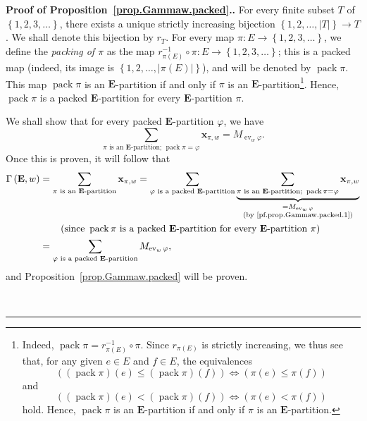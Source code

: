 \documentclass[numbers=enddot,12pt,final,onecolumn,notitlepage,abstracton]{scrartcl}
\theoremstyle{definition}
\newenvironment{proof}[1][Proof]{\noindent\textbf{#1.} }{\ \rule{0.5em}{0.5em}}
\let\sumnonlimits\sum
\renewcommand{\sum}{\sumnonlimits\limits}
\newcommand{\xx}{{\mathbf{x}}}
\newcommand{\ev}{\operatorname{ev}}
\newcommand{\pack}{\operatorname{pack}}
\newcommand{\EE}{{\mathbf{E}}}
\begin{document}
\begin{proof}[Proof of Proposition~\ref{prop.Gammaw.packed}.]
For every finite subset $T$ of
$\left\{1, 2, 3, \ldots\right\}$, there exists a unique strictly
increasing bijection $\left\{1, 2, \ldots,
\left|T\right|\right\} \to T$. We shall denote this bijection by
$r_T$.
For every map $\pi : E \to \left\{1, 2, 3, \ldots\right\}$, we
define the \textit{packing of $\pi$} as the map
$r_{\pi\left(E\right)}^{-1} \circ \pi : E \to
\left\{1, 2, 3, \ldots\right\}$; this is a packed map (indeed,
its image is
$\left\{1, 2, \ldots, \left|\pi\left(E\right)\right|\right\}$),
and will be
denoted by $\pack \pi$. This map $\pack \pi$ is an $\EE$-partition
if and only if $\pi$ is an $\EE$-partition\footnote{Indeed,
$\pack \pi = r_{\pi\left(E\right)}^{-1} \circ \pi$. Since
$r_{\pi\left(E\right)}$ is strictly increasing, we thus see that,
for any given $e \in E$ and $f \in E$, the equivalences
\[
\left(\left(\pack \pi\right)\left(e\right)
      \leq \left(\pack \pi\right)\left(f\right)\right)
\Longleftrightarrow
\left( \pi\left(e\right) \leq \pi\left(f\right) \right)
\]
and
\[
\left(\left(\pack \pi\right)\left(e\right)
      < \left(\pack \pi\right)\left(f\right)\right)
\Longleftrightarrow
\left( \pi\left(e\right) < \pi\left(f\right) \right)
\]
hold. Hence, $\pack \pi$ is an $\EE$-partition
if and only if $\pi$ is an $\EE$-partition.}.
Hence, $\pack \pi$ is a packed $\EE$-partition for every
$\EE$-partition $\pi$.

We shall show that for every packed $\EE$-partition $\varphi$, we
have
\begin{equation}
\sum_{\pi\text{ is an }\EE\text{-partition; } \pack \pi = \varphi}
\xx_{\pi, w} = M_{\ev_w \varphi} .
\label{pf.prop.Gammaw.packed.1}
\end{equation}
Once this is proven, it will follow that
\begin{align*}
\Gamma\left(\EE , w\right)
&= \sum_{\pi\text{ is an }\EE\text{-partition}}
  \xx_{\pi, w}
= \sum_{\varphi \text{ is a packed } \EE\text{-partition}}
  \underbrace{\sum_{\pi\text{ is an }\EE\text{-partition; } \pack \pi = \varphi}
              \xx_{\pi, w}}_{\substack{ = M_{\ev_w \varphi} \\
                             \text{(by \eqref{pf.prop.Gammaw.packed.1})}
                             }} \\
& \qquad \left(\text{since } \pack \pi \text{ is a packed }
             \EE\text{-partition for every }
             \EE\text{-partition } \pi\right) \\
&= \sum_{\varphi \text{ is a packed } \EE\text{-partition}}
M_{\ev_w \varphi} ,
\end{align*}
and Proposition~\ref{prop.Gammaw.packed} will be proven.


\end{proof}
\end{document}
